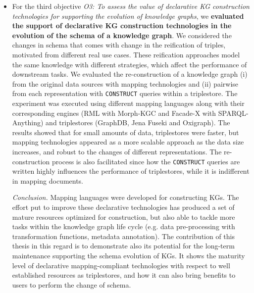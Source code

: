 \begin{itemize}
    \item For the third objective \textit{O3: To assess the value of declarative KG construction technologies for supporting the evolution of knowledge graphs}, we \textbf{evaluated the support of declarative KG construction technologies in the evolution of the schema of a knowledge graph}. We considered the changes in schema that comes with change in the reification of triples, motivated from different real use cases. These reification approaches model the same knowledge with different strategies, which affect the performance of downstream tasks. We evaluated the re-construction of a knowledge graph (i) from the original data sources with mapping technologies and (ii) pairwise from each representation with \texttt{CONSTRUCT} queries within a triplestore. The experiment was executed using different mapping languages along with their corresponding engines (RML with Morph-KGC and Facade-X with SPARQL-Anything) and triplestores (GraphDB, Jena Fuseki and Oxigraph). The results showed that for small amounts of data, triplestores were faster, but mapping technologies appeared as a more scalable approach as the data size increases, and robust to the changes of different representations. The re-construction process is also facilitated since how the \texttt{CONSTRUCT} queries are written highly influences the performance of triplestores, while it is indifferent in mapping documents. 

    \textit{Conclusion.} Mapping languages were developed for constructing KGs. The effort put  to improve these declarative technologies has produced a set of mature resources optimized for construction, but also able to tackle more tasks within the knowledge graph life cycle (e.g. data pre-processing with transformation functions, metadata annotation). The contribution of this thesis in this regard is to demonstrate also its potential for the long-term maintenance supporting the schema evolution of KGs. It shows the maturity level of declarative mapping-compliant technologies with respect to well established resources as triplestores, and how it can also bring benefits to users to perform the change of schema. 
\end{itemize}

